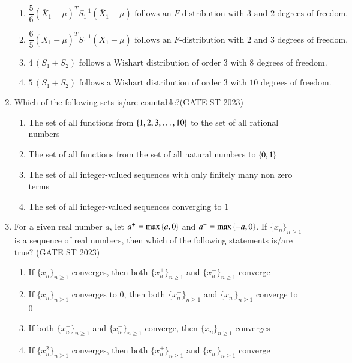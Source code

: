 \documentclass[journal]{IEEEtran}
\begin{document}
\begin{enumerate}[label=\textbf{Q.\arabic*.}, start=11, align=left, itemsep=2em]
\begin{enumerate}
    \item \[
    \frac{5}{6} (\bar{X}_1 - \mu)^{T} S_1^{-1} (\bar{X}_1 - \mu)
    \text{ follows an } F\text{-distribution with } 3 \text{ and } 2 \text{ degrees of freedom.}
    \]
    \item  \[
    \frac{6}{5} (\bar{X}_1 - \mu)^{T} S_1^{-1} (\bar{X}_1 - \mu)
    \text{ follows an } F\text{-distribution with } 2 \text{ and } 3 \text{ degrees of freedom.}
    \]
    \item  \[
    4\,(S_1 + S_2) \text{ follows a Wishart distribution of order } 3 \text{ with } 8 \text{ degrees of freedom.}
    \]
    \item\[
    5\,(S_1 + S_2) \text{ follows a Wishart distribution of order } 3 \text{ with } 10 \text{ degrees of freedom.}
    \]
\end{enumerate}

\item Which of the following sets is/are countable?\hfill(GATE ST 2023)
\begin{enumerate}
\item The set of all functions from $\left\{1,2,3,\dots,10\right\}$ to the set of all rational numbers
\item The set of all functions from the set of all natural numbers to $\left\{0,1\right\}$
\item The set of all integer-valued sequences with only finitely many non zero terms
\item The set of all integer-valued sequences converging to $1$
\end{enumerate}

\item For a given real number $a$, let $a^{+} = \max\left\{a, 0\right\}$ and $a^{-} = \max\left\{-a, 0\right\}$.  
If $\{x_n\}_{n \ge 1}$ is a sequence of real numbers, then which of the following statements is/are true? \hfill(GATE ST 2023) 

\begin{enumerate}
    \item If $\{x_n\}_{n \ge 1}$ converges, then both $\{x_n^{+}\}_{n \ge 1}$ and $\{x_n^{-}\}_{n \ge 1}$ converge
    \item If $\{x_n\}_{n \ge 1}$ converges to $0$, then both $\{x_n^{+}\}_{n \ge 1}$ and $\{x_n^{-}\}_{n \ge 1}$ converge to $0$
    \item If both $\{x_n^{+}\}_{n \ge 1}$ and $\{x_n^{-}\}_{n \ge 1}$ converge, then $\{x_n\}_{n \ge 1}$ converges
    \item If $\{x_n^2\}_{n \ge 1}$ converges, then both $\{x_n^{+}\}_{n \ge 1}$ and $\{x_n^{-}\}_{n \ge 1}$ converge
\end{enumerate}


\end{enumerate}
\end{document}
